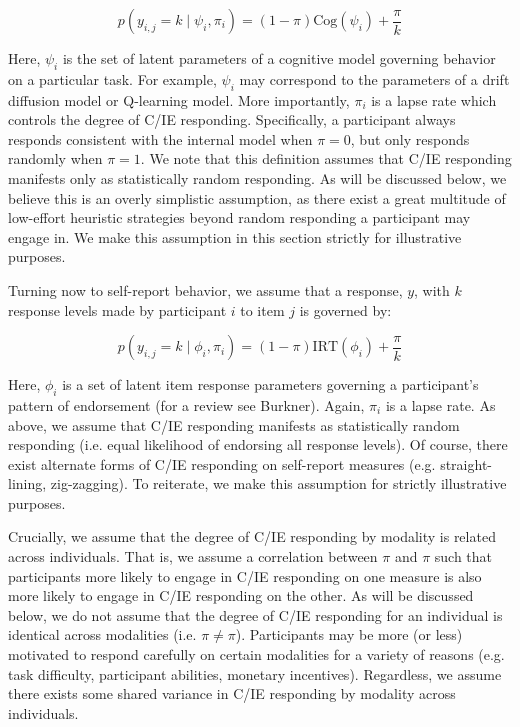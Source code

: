 \documentclass[a4paper,notitlepage,12pt]{article}
\begin{document}
\begin{equation}
    p(y_{i,j} = k \mid \psi_i, \pi_i) = (1-\pi)\text{Cog}(\psi_i) + \frac{\pi}{k}
\end{equation}

Here, $\psi_i$ is the set of latent parameters of a cognitive model governing behavior on a particular task. For example, $\psi_i$ may correspond to the parameters of a drift diffusion model or Q-learning model. More importantly, $\pi_i$ is a lapse rate which controls the degree of C/IE responding. Specifically, a participant always responds consistent with the internal model when $\pi=0$, but only responds randomly when $\pi=1$. We note that this definition assumes that C/IE responding manifests only as statistically random responding. As will be discussed below, we believe this is an overly simplistic assumption, as there exist a great multitude of low-effort heuristic strategies beyond random responding a participant may engage in. We make this assumption in this section strictly for illustrative purposes.

Turning now to self-report behavior, we assume that a response, $y$, with $k$ response levels made by participant $i$ to item $j$ is governed by:

\begin{equation}
    p(y_{i,j} = k \mid \phi_i, \pi_i) = (1-\pi)\text{IRT}(\phi_i) + \frac{\pi}{k}
\end{equation}

Here, $\phi_i$ is a set of latent item response parameters governing a participant's pattern of endorsement (for a review see Burkner). Again, $\pi_i$ is a lapse rate. As above, we assume that C/IE responding manifests as statistically random responding (i.e. equal likelihood of endorsing all response levels). Of course, there exist alternate forms of C/IE responding on self-report measures (e.g. straight-lining, zig-zagging). To reiterate, we make this assumption for strictly illustrative purposes. 

Crucially, we assume that the degree of C/IE responding by modality is related across individuals. That is, we assume a correlation between $\pi$ and $\pi$ such that participants more likely to engage in C/IE responding on one measure is also more likely to engage in C/IE responding on the other. As will be discussed below, we do not assume that the degree of C/IE responding for an individual is identical across modalities (i.e. $\pi \neq \pi$). Participants may be more (or less) motivated to respond carefully on certain modalities for a variety of reasons (e.g. task difficulty, participant abilities, monetary incentives). Regardless, we assume there exists some shared variance in C/IE responding by modality across individuals.  
\end{document}
